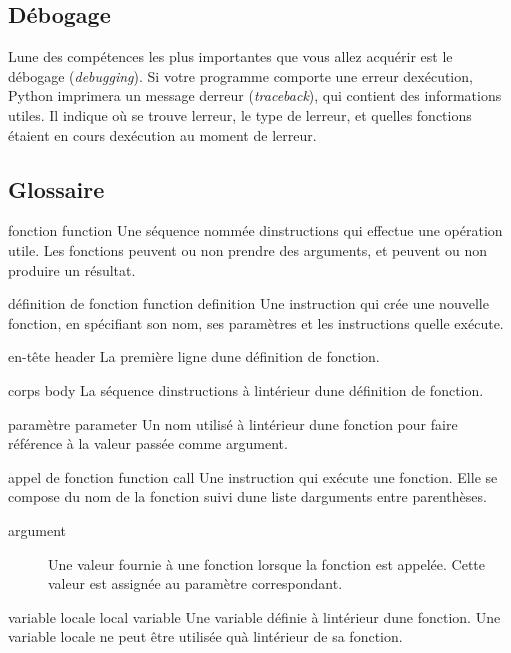 \hypertarget{duxe9bogage}{%
\subsection{Débogage}\label{duxe9bogage}}

L\textquotesingle une des compétences les plus importantes que vous
allez acquérir est le débogage (\emph{debugging}). Si votre programme
comporte une erreur d\textquotesingle exécution, Python imprimera un
message d\textquotesingle erreur (\emph{traceback}), qui contient des
informations utiles. Il indique où se trouve l\textquotesingle erreur,
le type de l\textquotesingle erreur, et quelles fonctions étaient en
cours d\textquotesingle exécution au moment de l\textquotesingle erreur.

\hypertarget{glossaire}{%
\subsection{Glossaire}\label{glossaire}}

fonction function Une séquence nommée d\textquotesingle instructions qui
effectue une opération utile. Les fonctions peuvent ou non prendre des
arguments, et peuvent ou non produire un résultat.

définition de fonction function definition Une instruction qui crée une
nouvelle fonction, en spécifiant son nom, ses paramètres et les
instructions qu\textquotesingle elle exécute.

en-tête header La première ligne d\textquotesingle une définition de
fonction.

corps body La séquence d\textquotesingle instructions à
l\textquotesingle intérieur d\textquotesingle une définition de
fonction.

paramètre parameter Un nom utilisé à l\textquotesingle intérieur
d\textquotesingle une fonction pour faire référence à la valeur passée
comme argument.

appel de fonction function call Une instruction qui exécute une
fonction. Elle se compose du nom de la fonction suivi
d\textquotesingle une liste d\textquotesingle arguments entre
parenthèses.

\begin{description}
\item[argument]
Une valeur fournie à une fonction lorsque la fonction est appelée. Cette
valeur est assignée au paramètre correspondant.
\end{description}

variable locale local variable Une variable définie à
l\textquotesingle intérieur d\textquotesingle une fonction. Une variable
locale ne peut être utilisée qu\textquotesingle à
l\textquotesingle intérieur de sa fonction.


